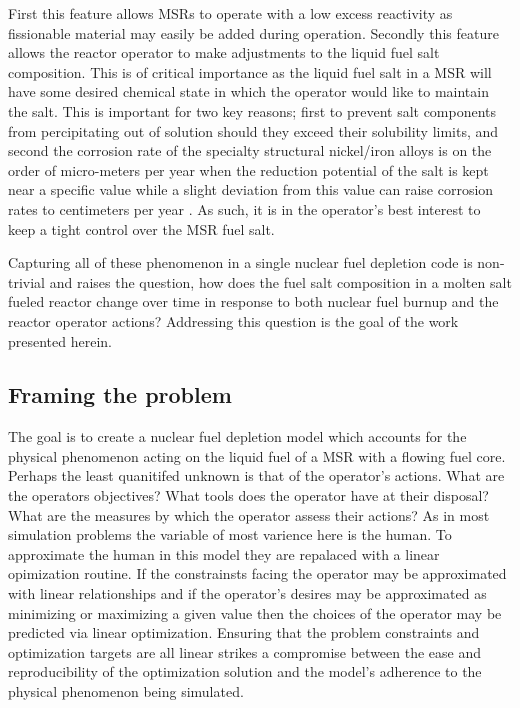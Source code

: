 First this feature allows MSRs to operate with a
low excess reactivity as fissionable material may easily be added during
operation. Secondly this feature allows the reactor operator to make adjustments
to the liquid fuel salt composition. This is of critical importance as the 
liquid fuel salt in a MSR will have some desired chemical state
in which the operator would like to maintain the salt. This is important for two
key reasons; first to prevent salt components from percipitating out of solution
should they exceed their solubility limits, and second the corrosion rate of the
specialty structural nickel/iron alloys is on the order of
micro-meters per year when the reduction potential of the salt is kept near
a specific value while a slight deviation from this value can raise corrosion
rates to centimeters per year \cite{Corrosion}. 
As such, it is in the operator's best interest to keep a tight control over 
the MSR fuel salt.

Capturing all of these phenomenon in a single nuclear fuel depletion code is
non-trivial and raises the question, how does the fuel salt composition in a 
molten salt fueled reactor change over time in response to both nuclear fuel
burnup and the reactor operator actions? Addressing this question is the goal
of the work presented herein. 

\subsection{Framing the problem}

The goal is to create a nuclear fuel depletion model which accounts for the
physical phenomenon acting on the liquid fuel of a MSR with a flowing fuel core.
Perhaps the least quanitifed unknown is that of the operator's actions. What are
the operators objectives? What tools does the operator have at their disposal?
What are the measures by which the operator assess their actions? As in most
simulation problems the variable of most varience here is the human. To
approximate the human in this model they are repalaced with a linear opimization
routine. If the constrainsts facing the operator may be approximated with linear
 relationships and if the operator's desires may be approximated as minimizing
or maximizing a given value then the choices of the operator may be predicted
via linear optimization. Ensuring that the problem constraints and optimization 
targets are all linear strikes a compromise between the ease and reproducibility
of the optimization solution and the model's adherence to the physical 
phenomenon being simulated.

